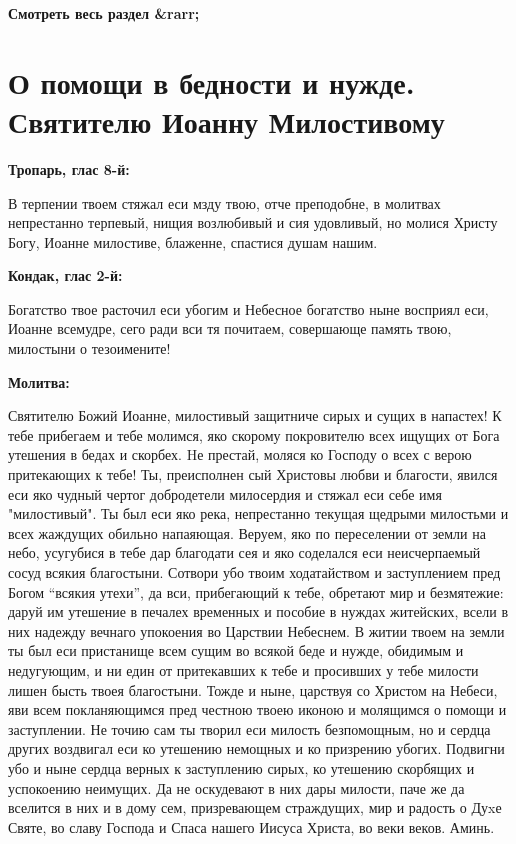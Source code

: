 \mychapterending


\bfseries Смотреть весь раздел &rarr;\normalfont{} 

\section{О помощи в бедности и нужде. Святителю Иоанну Милостивому}
 


\bfseries Тропарь, глас 8-й:\normalfont{}


В терпении твоем стяжал еси мзду твою, отче преподобне, в молитвах непрестанно терпевый, нищия возлюбивый и сия удовливый, но молися Христу Богу, Иоанне милостиве, блаженне, спастися душам нашим.


\medskip


\bfseries Кондак, глас 2-й:\normalfont{}


Богатство твое расточил еси убогим и Небесное богатство ныне восприял еси, Иоанне всемудре, сего ради вси тя почитаем, совершающе память твою, милостыни о тезоимените!


\medskip


\bfseries Молитва:\normalfont{}


Святителю Божий Иоанне, милостивый защитниче сирых и сущих в напастех! К тебе прибегаем и тебе молимся, яко скорому покровителю всех ищущих от Бога утешения в бедах и скорбех. Hе престай, моляся ко Господу о всех с верою притекающих к тебе! Ты, преисполнен сый Христовы любви и благости, явился еси яко чудный чертог добродетели милосердия и стяжал еси себе имя "милостивый". Ты был еси яко река, непрестанно текущая щедрыми милостьми и всех жаждущих обильно напаяющая. Веруем, яко по переселении от земли на небо, усугубися в тебе дар благодати сея и яко соделался еси неисчерпаемый сосуд всякия благостыни. Сотвори убо твоим ходатайством и заступлением пред Богом “всякия утехи”, да вси, прибегающий к тебе, обретают мир и безмятежие: даруй им утешение в печалех временных и пособие в нуждах житейских, всели в них надежду вечнаго упокоения во Царствии Небеснем. В житии твоем на земли ты был еси пристанище всем сущим во всякой беде и нужде, обидимым и недугующим, и ни един от притекавших к тебе и просивших у тебе милости лишен бысть твоея благостыни. Тожде и ныне, царствуя со Христом на Небеси, яви всем покланяющимся пред честною твоею иконою и молящимся о помощи и заступлении. Не точию сам ты творил еси милость безпомощным, но и сердца других воздвигал еси ко утешению немощных и ко призрению убогих. Подвигни убо и ныне сердца верных к заступлению сирых, ко утешению скорбящих и успокоению неимущих. Да не оскудевают в них дары милости, паче же да вселится в них и в дому сем, призревающем страждущих, мир и радость о Дуxе Святе, во славу Господа и Спаса нашего Иисуса Христа, во веки веков. Аминь.


